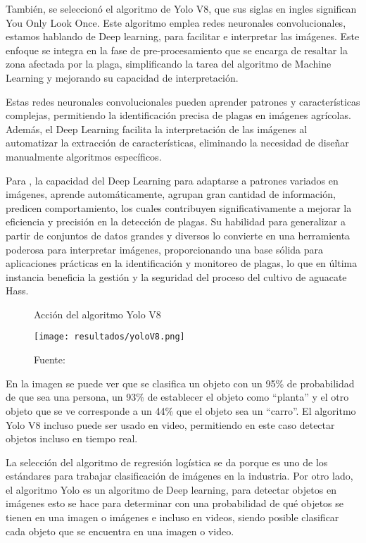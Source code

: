 También, se seleccionó el algoritmo de Yolo V8, que sus siglas en ingles significan You Only Look Once. Este algoritmo emplea redes neuronales convolucionales, estamos hablando de Deep learning, para facilitar e interpretar las imágenes. Este enfoque se integra en la fase de pre-procesamiento que se encarga de resaltar la zona afectada por la plaga, simplificando la tarea del algoritmo de Machine Learning y mejorando su capacidad de interpretación.

Estas redes neuronales convolucionales pueden aprender patrones y características complejas, permitiendo la identificación precisa de plagas en imágenes agrícolas. Además, el Deep Learning facilita la interpretación de las imágenes al automatizar la extracción de características, eliminando la necesidad de diseñar manualmente algoritmos específicos.

\newpage

Para \cite{schmidhuber2015deep}, la capacidad del Deep Learning para adaptarse a patrones variados en imágenes, aprende automáticamente, agrupan gran cantidad de información, predicen comportamiento, los cuales contribuyen significativamente a mejorar la eficiencia y precisión en la detección de plagas. Su habilidad para generalizar a partir de conjuntos de datos grandes y diversos lo convierte en una herramienta poderosa para interpretar imágenes, proporcionando una base sólida para aplicaciones prácticas en la identificación y monitoreo de plagas, lo que en última instancia beneficia la gestión y la seguridad del proceso del cultivo de aguacate Hass.

\begin{figure}[h]
\centering
\caption{Acción del algoritmo Yolo V8}
\texttt{[image: resultados/yoloV8.png]}
\caption*{\footnotesize Fuente: \cite{decoder2023}}
\label{fig:figuraYoloV8}
\end{figure}

En la imagen se puede ver que se clasifica un objeto con un 95\% de probabilidad de que sea una persona, un 93\% de establecer el objeto como “planta” y el otro objeto que se ve corresponde a un 44\% que el objeto sea un “carro”. El algoritmo Yolo V8 incluso puede ser usado en video, permitiendo en este caso detectar objetos incluso en tiempo real.

La selección del algoritmo de regresión logística se da porque es uno de los estándares para trabajar clasificación de imágenes en la industria. Por otro lado, el algoritmo Yolo es un algoritmo de Deep learning, para detectar objetos en imágenes esto se hace para determinar con una probabilidad de qué objetos se tienen en una imagen o imágenes e incluso en videos, siendo posible clasificar cada objeto que se encuentra en una imagen o video.

